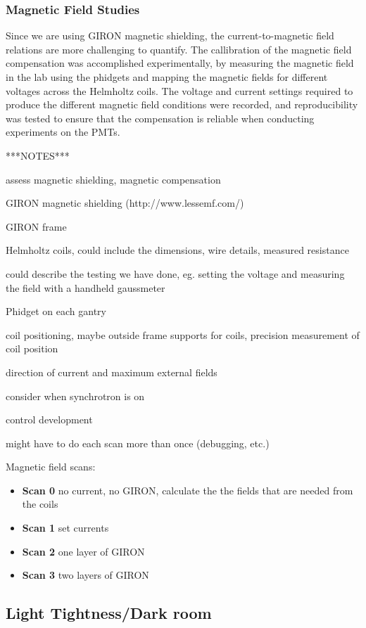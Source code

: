 \subsubsection{Magnetic Field Studies}

Since we are using GIRON magnetic shielding, the current-to-magnetic field relations are more challenging to quantify. The callibration of the magnetic field compensation was accomplished experimentally, by measuring the magnetic field in the lab using the phidgets and mapping the magnetic fields for different voltages across the Helmholtz coils. The voltage and current settings required to produce the different magnetic field conditions were recorded, and reproducibility was tested to ensure that the compensation is reliable when conducting experiments on the PMTs.

***NOTES***

assess magnetic shielding, magnetic compensation

GIRON magnetic shielding (http://www.lessemf.com/)

GIRON frame

Helmholtz coils, could include the dimensions, wire details,
measured resistance

could describe the testing we have done, eg. setting the voltage and
measuring the field with a handheld gaussmeter

Phidget on each gantry


coil positioning, maybe outside frame supports for coils, precision measurement of coil position

direction of current and maximum external fields

consider when synchrotron is on

control development

might have to do each scan more than once (debugging, etc.)

Magnetic field scans:
\begin{itemize}
\item{\bf Scan 0} no current, no GIRON, calculate the the fields that are needed from the coils
\item{\bf Scan 1} set currents
\item{\bf Scan 2} one layer of GIRON
\item{\bf Scan 3} two layers of GIRON
\end{itemize}


\subsection{Light Tightness/Dark room}

